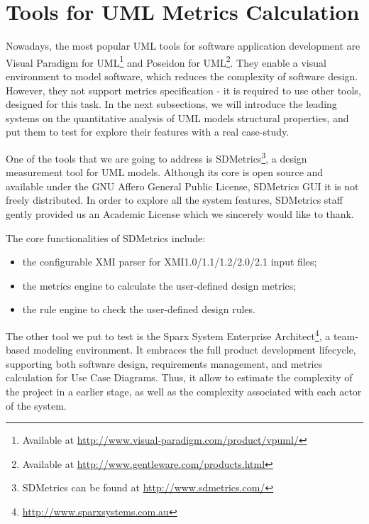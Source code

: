 \section{Tools for UML Metrics Calculation} \label{tools}

Nowadays, the most popular UML tools for software application development are \textsf{Visual Paradigm for UML\footnote{Available at \url{http://www.visual-paradigm.com/product/vpuml/}}} and \textsf{Poseidon for UML}\footnote{Available at \url{http://www.gentleware.com/products.html}}.
They enable a visual environment to model software, which reduces the complexity of software design.
However, they not support metrics specification - it is required to use other tools, designed for this task.
In the next subsections, we will introduce the leading systems on the quantitative analysis of UML models structural properties, and put them to test for explore their features with a real case-study.

One of the tools that we are going to address is SDMetrics\footnote{SDMetrics can be found at \url{http://www.sdmetrics.com/}}, a design measurement tool for UML models.
Although its core is open source and available under the GNU Affero General Public License, SDMetrics GUI it is not freely distributed. 
In order to explore all the system features, SDMetrics staff gently provided us an Academic License which we sincerely would like to thank.

The core functionalities of SDMetrics include:
\begin{itemize}
\item the configurable XMI parser for XMI1.0/1.1/1.2/2.0/2.1 input files;
\item the metrics engine to calculate the user-defined design metrics;
\item the rule engine to check the user-defined design rules.
\end{itemize}


The other tool we put to test is the \textsf{Sparx System Enterprise Architect}{\footnote{\url{http://www.sparxsystems.com.au}}}, a team-based modeling environment. 
It embraces the full product development lifecycle, supporting both software design, requirements management, and metrics calculation for Use Case Diagrams.
Thus, it allow to estimate the complexity of the project in a earlier stage, as well as the complexity associated with each actor of the system.

